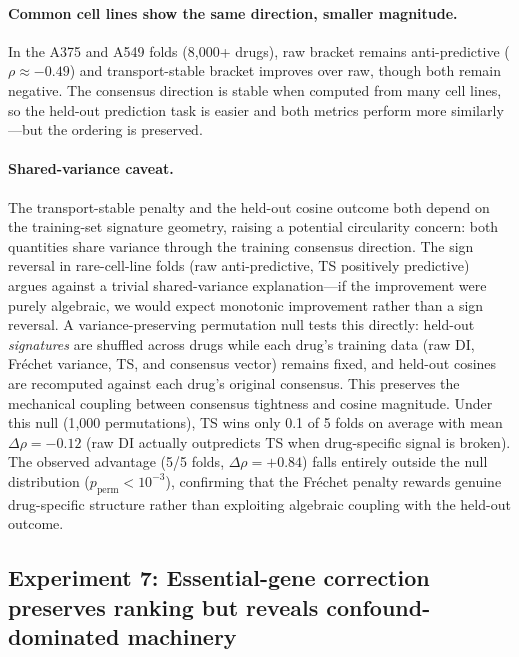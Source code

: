 \documentclass{article}
\begin{document}
\paragraph{Common cell lines show the same direction, smaller magnitude.}
In the A375 and A549 folds (8{,}000+ drugs), raw bracket remains
anti-predictive ($\rho \approx -0.49$) and transport-stable bracket
improves over raw, though both remain negative. The consensus direction
is stable when computed from many cell lines, so the held-out prediction
task is easier and both metrics perform more similarly---but the ordering
is preserved.

\paragraph{Shared-variance caveat.}
The transport-stable penalty and the held-out cosine outcome both depend on
the training-set signature geometry, raising a potential circularity concern:
both quantities share variance through the training consensus direction.
The sign reversal in rare-cell-line folds (raw anti-predictive, TS
positively predictive) argues against a trivial shared-variance
explanation---if the improvement were purely algebraic,
we would expect monotonic improvement rather than a sign reversal. A
variance-preserving permutation null tests this directly: held-out
\emph{signatures} are shuffled across drugs while each drug's training
data (raw DI, Fr\'echet variance, TS, and consensus vector) remains
fixed, and held-out cosines are recomputed against each drug's original
consensus. This preserves the mechanical coupling between consensus
tightness and cosine magnitude. Under this null (1{,}000 permutations),
TS wins only 0.1 of 5 folds on average with mean $\Delta\rho = -0.12$
(raw DI actually outpredicts TS when drug-specific signal is broken).
The observed advantage (5/5 folds, $\Delta\rho = +0.84$) falls entirely
outside the null distribution ($p_{\text{perm}} < 10^{-3}$), confirming
that the Fr\'echet penalty rewards genuine drug-specific structure rather
than exploiting algebraic coupling with the held-out outcome.

\subsection{Experiment 7: Essential-gene correction preserves ranking but reveals confound-dominated machinery}
\end{document}
